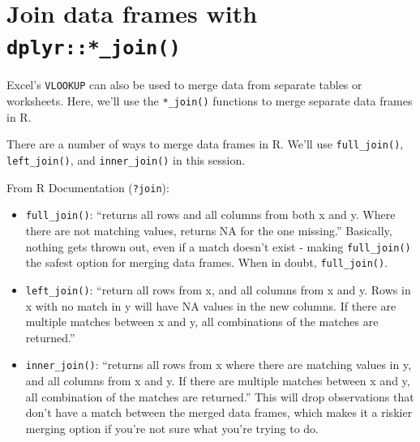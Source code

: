 \documentclass[]{book}
\begin{document}
\hypertarget{join-data-frames-with-dplyr_join}{%
\section{\texorpdfstring{Join data frames with \texttt{dplyr::*\_join()}}{Join data frames with dplyr::*\_join()}}\label{join-data-frames-with-dplyr_join}}

Excel's \texttt{VLOOKUP} can also be used to merge data from separate tables or worksheets. Here, we'll use the \texttt{*\_join()} functions to merge separate data frames in R.

There are a number of ways to merge data frames in R. We'll use \texttt{full\_join()}, \texttt{left\_join()}, and \texttt{inner\_join()} in this session.

From R Documentation (\texttt{?join}):

\begin{itemize}
\item
  \texttt{full\_join()}: ``returns all rows and all columns from both x and y. Where there are not matching values, returns NA for the one missing.'' Basically, nothing gets thrown out, even if a match doesn't exist - making \texttt{full\_join()} the safest option for merging data frames. When in doubt, \texttt{full\_join()}.
\item
  \texttt{left\_join()}: ``return all rows from x, and all columns from x and y. Rows in x with no match in y will have NA values in the new columns. If there are multiple matches between x and y, all combinations of the matches are returned.''
\item
  \texttt{inner\_join()}: ``returns all rows from x where there are matching values in y, and all columns from x and y. If there are multiple matches between x and y, all combination of the matches are returned.'' This will drop observations that don't have a match between the merged data frames, which makes it a riskier merging option if you're not sure what you're trying to do.
\end{itemize}
\end{document}
